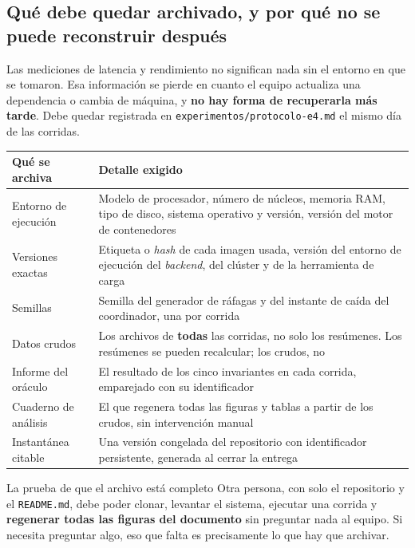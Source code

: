\documentclass[11pt,a4paper]{article}
\begin{document}
\subsection{Qué debe quedar archivado, y por qué no se puede reconstruir después}

Las mediciones de latencia y rendimiento no significan nada sin el entorno en que se tomaron. Esa información se pierde en cuanto el equipo actualiza una dependencia o cambia de máquina, y \textbf{no hay forma de recuperarla más tarde}. Debe quedar registrada en \texttt{experimentos/protocolo-e4.md} el mismo día de las corridas.

\begin{center}
	\small
	\begin{tabular}{@{}p{4.4cm}p{10.5cm}@{}}
		\toprule
		\textbf{Qué se archiva} & \textbf{Detalle exigido} \\
		\midrule
		Entorno de ejecución & Modelo de procesador, número de núcleos, memoria RAM, tipo de disco, sistema operativo y versión, versión del motor de contenedores \\
		\addlinespace
		Versiones exactas & Etiqueta o \emph{hash} de cada imagen usada, versión del entorno de ejecución del \emph{backend}, del clúster y de la herramienta de carga \\
		\addlinespace
		Semillas & Semilla del generador de ráfagas y del instante de caída del coordinador, una por corrida \\
		\addlinespace
		Datos crudos & Los archivos de \textbf{todas} las corridas, no solo los resúmenes. Los resúmenes se pueden recalcular; los crudos, no \\
		\addlinespace
		Informe del oráculo & El resultado de los cinco invariantes en cada corrida, emparejado con su identificador \\
		\addlinespace
		Cuaderno de análisis & El que regenera todas las figuras y tablas a partir de los crudos, sin intervención manual \\
		\addlinespace
		Instantánea citable & Una versión congelada del repositorio con identificador persistente, generada al cerrar la entrega \\
		\bottomrule
	\end{tabular}
\end{center}

\begin{defBox}{La prueba de que el archivo está completo}
	Otra persona, con solo el repositorio y el \texttt{README.md}, debe poder clonar, levantar el sistema, ejecutar una corrida y \textbf{regenerar todas las figuras del documento} sin preguntar nada al equipo. Si necesita preguntar algo, eso que falta es precisamente lo que hay que archivar.
\end{defBox}
\end{document}
